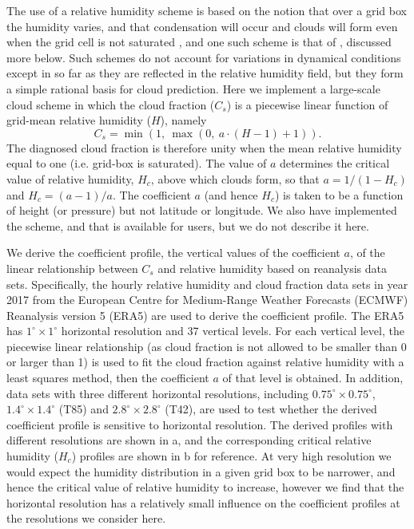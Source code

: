 The use of a relative humidity scheme is based on the notion that over a grid box the humidity varies, and that condensation will occur and clouds will form even when the grid cell is not saturated \citep{Tompkins2005, Quaas2012}, and one such scheme is that of \citet{Sundqvist1989}, discussed more below. Such schemes do not account for variations in dynamical conditions except in so far as they are reflected in the relative humidity field, but they form a simple rational basis for cloud prediction. Here we implement a large-scale cloud scheme in which the cloud fraction ($C_{s}$) is a piecewise linear function of grid-mean relative humidity ($H$), namely
\begin{equation}
	C_{s}=\min\left(1, ~\max \left(0, ~ a \cdot (H -1) + 1 \right)\right).
	\label{eq:linear_cf_rh} 
\end{equation}
The diagnosed cloud fraction is therefore unity when the mean relative humidity equal to one (i.e. grid-box is saturated). The value of $a$ determines the critical value of relative humidity, $H_c$, above which clouds form, so that $a=1/\left(1-H_{c}\right)$ and $H_c = (a -1)/a$. The coefficient $a$ (and hence $H_{c}$) is taken to be a function of height (or pressure) but not latitude or longitude.  We also have implemented the \citet{Sundqvist1989} scheme, and that is available for users, but we do not describe it here. 

We derive the coefficient profile, the vertical values of the coefficient $a$, of the linear relationship between $C_s$ and relative humidity based on reanalysis data sets. Specifically, the hourly relative humidity and cloud fraction data sets in year 2017 from the European Centre for Medium-Range Weather Forecasts (ECMWF) Reanalysis version 5 (ERA5) \citep{era5} are used to derive the coefficient profile. The ERA5 has $1^{\circ}\times 1^{\circ}$ horizontal resolution and 37 vertical levels. For each vertical level, the piecewise linear relationship (as cloud fraction is not allowed to be smaller than 0 or larger than 1) is used to fit the cloud fraction against relative humidity with a least squares method, then the coefficient $a$ of that level is obtained. In addition, data sets with three different horizontal resolutions, including $0.75^{\circ}\times 0.75^{\circ}$, $1.4^{\circ}\times 1.4^{\circ}$ (T85) and $2.8^{\circ}\times 2.8^{\circ}$ (T42), are used to test whether the derived coefficient profile is sensitive to horizontal resolution. The derived profiles with different resolutions are shown in a, and the corresponding critical relative humidity ($H_c$) profiles are shown in b for reference. At very high resolution we would expect the humidity distribution in a given grid box to be narrower, and hence the critical value of relative humidity to increase, however we find that the horizontal resolution has a relatively small influence on the coefficient profiles at the resolutions we consider here. 

